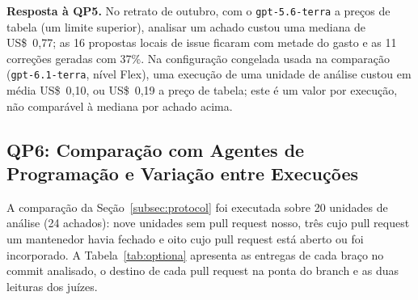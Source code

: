\documentclass[conference]{IEEEtran}
\newcommand{\researchq}[1]{\textbf{QP#1}}
\begin{document}
\textbf{Resposta à \researchq{5}.} No retrato de outubro, com o
\texttt{gpt-5.6-terra} a preços de tabela (um limite superior), analisar um achado
custou uma mediana de US\$~0,77; as 16 propostas locais de issue ficaram com
metade do gasto e as 11 correções geradas com 37\%. Na
configuração congelada usada na comparação (\texttt{gpt-6.1-terra}, nível
Flex), uma execução de uma unidade de análise custou em média US\$~0,10, ou US\$~0,19 a
preço de tabela; este é um valor por execução, não comparável à mediana por
achado acima.

\subsection{\researchq{6}: Comparação com Agentes de Programação e Variação entre Execuções}
\label{subsec:rq6}

A comparação da Seção~\ref{subsec:protocol} foi executada sobre 20 unidades de análise (24 achados): nove
unidades sem pull request nosso, três cujo pull request um mantenedor
havia fechado e oito cujo pull request está aberto ou foi incorporado.
A Tabela~\ref{tab:optiona} apresenta as entregas de cada braço no commit analisado, o
destino de cada pull request na ponta do branch e as duas leituras dos juízes.
\end{document}
